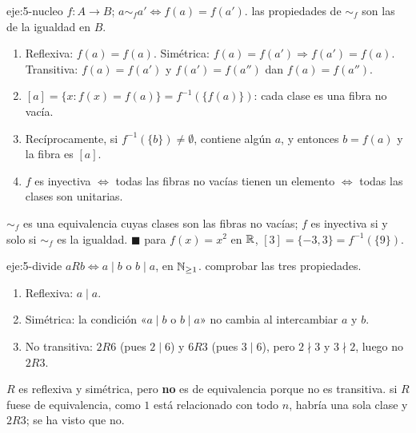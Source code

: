 \begin{solucion}{eje:5-nucleo}
\datos $f\colon A\to B$; $a\sim_f a'\iff f(a)=f(a')$.
\planteamiento las propiedades de $\sim_f$ son las de la igualdad en $B$.
\pasos
\begin{enumerate}[label=\arabic*.]
  \item Reflexiva: $f(a)=f(a)$. Simétrica: $f(a)=f(a')\Rightarrow f(a')=f(a)$. Transitiva: $f(a)=f(a')$ y $f(a')=f(a'')$ dan $f(a)=f(a'')$.
  \item $[a]=\{x: f(x)=f(a)\}=f^{-1}(\{f(a)\})$: cada clase es una fibra no vacía.
  \item Recíprocamente, si $f^{-1}(\{b\})\neq\emptyset$, contiene algún $a$, y entonces $b=f(a)$ y la fibra es $[a]$.
  \item $f$ es inyectiva $\iff$ todas las fibras no vacías tienen un elemento $\iff$ todas las clases son unitarias.
\end{enumerate}
\resultado $\sim_f$ es una equivalencia cuyas clases son las fibras no vacías; $f$ es inyectiva si y solo si $\sim_f$ es la igualdad. \hfill$\blacksquare$
\comprobacion para $f(x)=x^{2}$ en $\mathbb{R}$, $[3]=\{-3,3\}=f^{-1}(\{9\})$.
\end{solucion}

\begin{solucion}{eje:5-divide}
\datos $aRb\iff a\mid b$ o $b\mid a$, en $\mathbb{N}_{\ge1}$.
\planteamiento comprobar las tres propiedades.
\pasos
\begin{enumerate}[label=\arabic*.]
  \item Reflexiva: $a\mid a$.
  \item Simétrica: la condición «$a\mid b$ o $b\mid a$» no cambia al intercambiar $a$ y $b$.
  \item No transitiva: $2R6$ (pues $2\mid6$) y $6R3$ (pues $3\mid6$), pero $2\nmid3$ y $3\nmid2$, luego no $2R3$.
\end{enumerate}
\resultado $R$ es reflexiva y simétrica, pero \textbf{no} es de equivalencia porque no es transitiva.
\comprobacion si $R$ fuese de equivalencia, como $1$ está relacionado con todo $n$, habría una sola clase y $2R3$; se ha visto que no.
\end{solucion}

